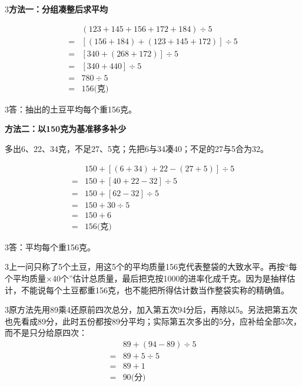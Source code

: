 \documentclass[multi=snippet,border={5bp 20bp 5bp 5bp}]{standalone}
\newenvironment{snippet}[3]{\begin{minipage}{#1bp}\color{answerred}\fontsize{#2}{#3}\selectfont\raggedright}{\end{minipage}}
\begin{document}
\begin{snippet}{505}{11.5}{14}\begin{multicols}{3}\raggedcolumns \textbf{方法一：分组凑整后求平均}\end{multicols}\[\begin{aligned}&(123+145+156+172+184)\div5\\={}&[(156+184)+(123+145+172)]\div5\\={}&[340+(268+172)]\div5\\={}&[340+440]\div5\\={}&780\div5\\={}&156\text{(克)}\end{aligned}\]\begin{multicols}{3}\raggedcolumns 答：抽出的土豆平均每个重156克。\par \textbf{方法二：以150克为基准移多补少}\par 多出6、22、34克，不足27、5克；先把6与34凑40；不足的27与5合为32。\end{multicols}\[\begin{aligned}&150+[(6+34)+22-(27+5)]\div5\\={}&150+[40+22-32]\div5\\={}&150+[62-32]\div5\\={}&150+30\div5\\={}&150+6\\={}&156\text{(克)}\end{aligned}\]\begin{multicols}{3}\raggedcolumns 答：平均每个重156克。\end{multicols}\end{snippet}
\begin{snippet}{505}{11.5}{14}\begin{multicols}{3}\raggedcolumns 上一问只称了5个土豆，用这5个的平均质量156克代表整袋的大致水平。再按“每个平均质量×40个”估计总质量，最后把克按1000的进率化成千克。因为是抽样估计，不能说每个土豆都重156克，也不能把所得估计数当作整袋实称的精确值。\end{multicols}\end{snippet}
\begin{snippet}{505}{11.5}{14}\begin{multicols}{3}\raggedcolumns 原方法先用89乘4还原前四次总分，加入第五次94分后，再除以5。另法把第五次也先看成89分，此时五份都按89分平均；实际第五次多出的5分，应补给全部5次，而不是只分给原四次：\[\begin{aligned}&89+(94-89)\div5\\={}&89+5\div5\\={}&89+1\\={}&90\text{(分)}\end{aligned}\]\end{multicols}\end{snippet}
\end{document}
